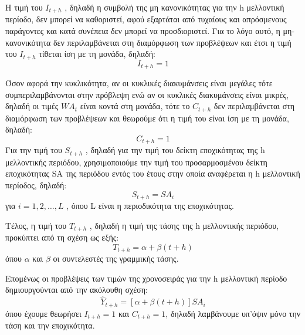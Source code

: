 Η τιμή του $I_{t+h}$ , δηλαδή η συμβολή της μη κανονικότητας για την h μελλοντική
περίοδο, δεν μπορεί να καθοριστεί, αφού εξαρτάται από τυχαίους και απρόσμενους
παράγοντες και κατά συνέπεια δεν μπορεί να προσδιοριστεί. Για το λόγο αυτό, η μη-
κανονικότητα δεν περιλαμβάνεται στη διαμόρφωση των προβλέψεων και έτσι η τιμή
του $I_{t+h}$ τίθεται ίση με τη μονάδα, δηλαδή:\\
$$ I_{t+h}=1 $$

Όσον αφορά την κυκλικότητα, αν οι κυκλικές διακυμάνσεις είναι μεγάλες τότε
συμπεριλαμβάνονται στην πρόβλεψη ενώ αν οι κυκλικές διακυμάνσεις είναι μικρές,
δηλαδή οι τιμές $WA_t$ είναι κοντά στη μονάδα, τότε το $C_{t+h}$ δεν περιλαμβάνεται στη
διαμόρφωση των προβλέψεων και θεωρούμε ότι η τιμή του είναι ίση με τη μονάδα,
δηλαδή:\\
$$ C_{t+h}=1 $$
Για την τιμή του $S_{t+h}$ , δηλαδή για την τιμή του δείκτη εποχικότητας της h
μελλοντικής περιόδου, χρησιμοποιούμε την τιμή του προσαρμοσμένου δείκτη
εποχικότητας SA της περιόδου εντός του έτους στην οποία αναφέρεται η h
μελλοντική περίοδος, δηλαδή:\\
$$ S_{t+h}=SA_i $$
για $i = 1, 2,\ldots,L$ , όπου L είναι η περιοδικότητα της εποχικότητας.

Τέλος, η τιμή του $T_{t+h}$ , δηλαδή η τιμή της τάσης της h μελλοντικής περιόδου,
προκύπτει από τη σχέση ως εξής:\\
$$ T_{t+h}=\alpha+\beta \left(t+h\right) $$
όπου $\alpha$ και $\beta$ οι συντελεστές της γραμμικής τάσης.

Επομένως οι προβλέψεις των τιμών της χρονοσειράς για την h μελλοντική
περίοδο δημιουργούνται από την ακόλουθη σχέση:\\
$$ \widehat{Y}_{t+h}=\left[\alpha+\beta\left(t+h\right)\right]SA_i  $$
όπου έχουμε θεωρήσει $I_{t+h} = 1$ και $C_{t+h} = 1$, δηλαδή λαμβάνουμε υπ’όψιν μόνο την
τάση και την εποχικότητα.
\endinput
